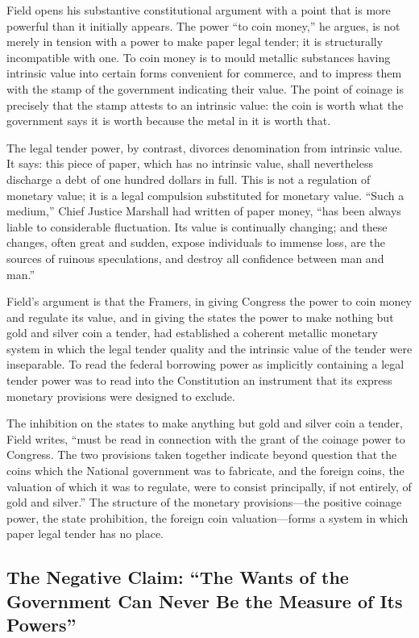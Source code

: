 \documentclass[12pt]{article}
\begin{document}
Field opens his substantive constitutional argument with a point that
is more powerful than it initially appears. The power ``to coin money,''
he argues, is not merely in tension with a power to make paper legal
tender; it is structurally incompatible with one. To coin money is
to mould metallic substances having intrinsic value into certain forms
convenient for commerce, and to impress them with the stamp of the
government indicating their value. The point of coinage is precisely
that the stamp attests to an intrinsic value: the coin is worth what
the government says it is worth because the metal in it is worth that.

The legal tender power, by contrast, divorces denomination from
intrinsic value. It says: this piece of paper, which has no intrinsic
value, shall nevertheless discharge a debt of one hundred dollars in
full. This is not a regulation of monetary value; it is a legal
compulsion substituted for monetary value. ``Such a medium,'' Chief
Justice Marshall had written of paper money, ``has been always liable
to considerable fluctuation. Its value is continually changing; and
these changes, often great and sudden, expose individuals to immense
loss, are the sources of ruinous speculations, and destroy all
confidence between man and man.''

Field's argument is that the Framers, in giving Congress the power
to coin money and regulate its value, and in giving the states the
power to make nothing but gold and silver coin a tender, had established
a coherent metallic monetary system in which the legal tender quality
and the intrinsic value of the tender were inseparable. To read the
federal borrowing power as implicitly containing a legal tender power
was to read into the Constitution an instrument that its express
monetary provisions were designed to exclude.

The inhibition on the states to make anything but gold and silver coin
a tender, Field writes, ``must be read in connection with the grant of
the coinage power to Congress. The two provisions taken together
indicate beyond question that the coins which the National government
was to fabricate, and the foreign coins, the valuation of which it
was to regulate, were to consist principally, if not entirely, of
gold and silver.'' The structure of the monetary provisions---the
positive coinage power, the state prohibition, the foreign coin
valuation---forms a system in which paper legal tender has no place.

\subsection{The Negative Claim: ``The Wants of the Government Can
Never Be the Measure of Its Powers''}
\end{document}
